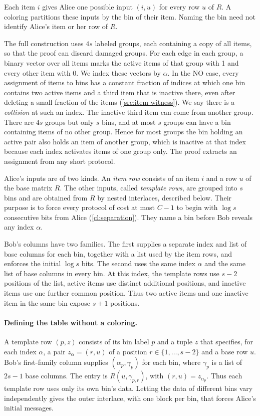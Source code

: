 \documentclass[11pt,letterpaper]{article} \usepackage[utf8]{inputenc}
\theoremstyle{plain} \newtheorem{theorem}{Theorem}[section]
\theoremstyle{definition} \newaliascnt{definition}{theorem}
\begin{document}
Each item $i$ gives Alice one possible input $(i,u)$ for every row $u$
of $R$. A coloring partitions these inputs by the
bin of their item. Naming the bin need not identify Alice's item or her row of $R$.

The full construction uses $4s$ labeled groups, each containing a copy of
all items, so that the proof can discard damaged groups. For each edge in each group, a binary vector over all items marks the
active items of that group with 1 and every other item with 0. We index these
vectors by $\alpha$. In the NO case, every assignment of items to bins has a
constant fraction of indices at which one bin contains two active items and
a third item that is inactive there, even after deleting a small fraction of
the items (\cref{src:item-witness}). We say there is a \emph{collision}
at such an index. The inactive third item can come from another group. There
are $4s$ groups but only $s$ bins, and at most $s$ groups can have a bin
containing items of no other group. Hence for most groups the bin holding an
active pair also holds an item of another group, which is inactive at that
index because each index activates items of one group only.
The proof extracts an assignment from any short protocol.

Alice's inputs are of two kinds. An \emph{item row} consists
of an item $i$ and a row $u$ of the base matrix $R$. The other inputs,
called \emph{template rows}, are grouped into $s$ bins and are obtained
from $R$ by nested interlaces, described below. Their purpose is to force
every protocol of cost at most $C-1$ to begin with $\log s$ consecutive bits
from Alice (\cref{cl:separation}). They name a bin before Bob reveals any
index $\alpha$.

Bob's columns have two families. The first supplies a separate index
and list of base columns for each bin, together with a list used by the
item rows, and enforces the initial $\log s$ bits. The second uses the same
index $\alpha$ and the same list of base columns in every bin. At this
index, the template rows use $s-2$ positions of the list, active items
use distinct additional positions, and inactive items use one further
common position. Thus two active items and one inactive item in the
same bin expose $s+1$ positions.

\paragraph{Defining the table without a coloring.}
A template row $(p,z)$ consists of its bin label $p$ and a tuple $z$ that
specifies, for each index $\alpha$, a pair $z_\alpha=(r,u)$ of a position
$r\in\{1,\ldots,s-2\}$ and a base row $u$. Bob's first-family column
supplies $(\alpha_p,\gamma_p)$ for each bin, where $\gamma_p$ is a list
of $2s-1$ base columns. The entry is $R(u,\gamma_{p,r})$, with
$(r,u)=z_{\alpha_p}$. Thus each template row uses only its own bin's
data. Letting the data of different bins vary independently gives the
outer interlace, with one block per bin, that forces Alice's initial messages.
\end{document}
